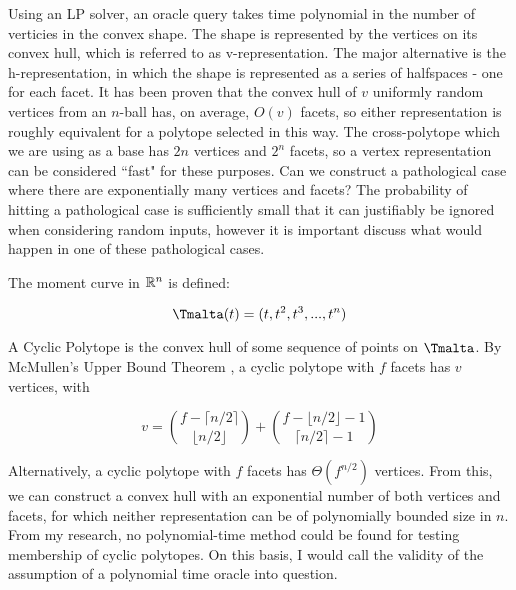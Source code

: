 Using an LP solver, an oracle query takes time polynomial in the number of verticies in the convex shape. The shape is represented by the vertices on its convex hull, which is referred to as v-representation. The major alternative is the h-representation, in which the shape is represented as a series of halfspaces - one for each facet. It has been proven \cite{Buchta85} that the convex hull of $v$ uniformly random vertices from an $n$-ball has, on average, $O(v)$ facets, so either representation is roughly equivalent for a polytope selected in this way. The cross-polytope which we are using as a base has $2n$ vertices and $2^n$ facets, so a vertex representation can be considered ``fast" for these purposes. Can we construct a pathological case where there are exponentially many vertices and facets? The probability of hitting a pathological case is sufficiently small that it can justifiably be ignored when considering random inputs, however it is important discuss what would happen in one of these pathological cases.

The moment curve in $\mathbb{R}^n$ is defined:

$$
\tengm(t) = (t, t^2, t^3, ..., t^n)
$$

A Cyclic Polytope is the convex hull of some sequence of points on $\tengm$. By McMullen's Upper Bound Theorem \cite{McMullen70}, a cyclic polytope with $f$ facets has $v$ vertices, with

$$
v = {{f-\lceil n/2 \rceil}\choose{\lfloor {n/2} \rfloor}} + {{f-\lfloor n/2 \rfloor -1} \choose {\lceil {n/2} \rceil - 1}}
$$

Alternatively, a cyclic polytope with $f$ facets has $\Theta(f^{n/2})$ vertices. From this, we can construct a convex hull with an exponential number of both vertices and facets, for which neither representation can be of polynomially bounded size in $n$. From my research, no polynomial-time method could be found for testing membership of cyclic polytopes. On this basis, I would call the validity of the assumption of a polynomial time oracle into question. 